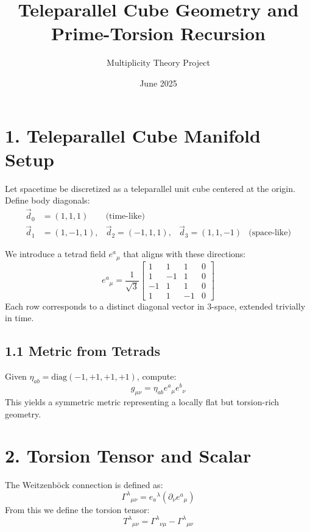 \documentclass[12pt]{article}
\begin{document}
\title{Teleparallel Cube Geometry and Prime-Torsion Recursion}
\author{Multiplicity Theory Project}
\date{June 2025}

\maketitle

\section*{1. Teleparallel Cube Manifold Setup}

Let spacetime be discretized as a teleparallel unit cube centered at the origin. Define body diagonals:
\begin{align*}
\vec{d}_0 &= (1,1,1) &\text{(time-like)} \\
\vec{d}_1 &= (1,-1,1), &\vec{d}_2 = (-1,1,1), &\vec{d}_3 = (1,1,-1) &\text{(space-like)}
\end{align*}

We introduce a tetrad field $e^a{}_{\mu}$ that aligns with these directions:
\begin{equation}
    e^a{}_{\mu} = \frac{1}{\sqrt{3}}
    \begin{bmatrix}
        1 & 1 & 1 & 0 \\
        1 & -1 & 1 & 0 \\
        -1 & 1 & 1 & 0 \\
        1 & 1 & -1 & 0
    \end{bmatrix}
\end{equation}
Each row corresponds to a distinct diagonal vector in 3-space, extended trivially in time.

\subsection*{1.1 Metric from Tetrads}

Given $\eta_{ab} = \text{diag}(-1,+1,+1,+1)$, compute:
\begin{equation}
    g_{\mu\nu} = \eta_{ab} e^a{}_{\mu} e^b{}_{\nu}
\end{equation}
This yields a symmetric metric representing a locally flat but torsion-rich geometry.

\section*{2. Torsion Tensor and Scalar}

The Weitzenb\"ock connection is defined as:
\begin{equation}
    \Gamma^\lambda{}_{\mu\nu} = e_a{}^\lambda (\partial_\nu e^a{}_{\mu})
\end{equation}
From this we define the torsion tensor:
\begin{equation}
    T^\lambda{}_{\mu\nu} = \Gamma^\lambda{}_{\nu\mu} - \Gamma^\lambda{}_{\mu\nu}
\end{equation}
\end{document}
